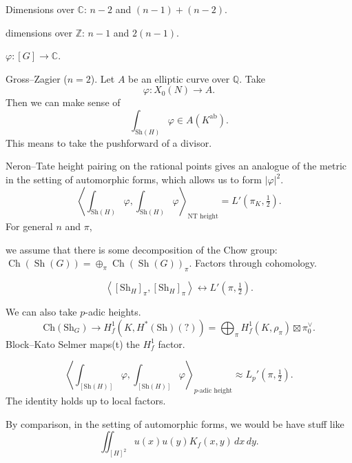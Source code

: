 \documentclass[reqno]{amsart} 
\begin{document}
Dimensions over $\mathbb{C}$: $n - 2$ and $(n - 1) +(n - 2)$.

dimensions over $\mathbb{Z}$: $n - 1$ and $2(n - 1)$.

$\varphi : [G] \rightarrow \mathbb{C}$.

\begin{example}\label{example:cnfg5j3x18}
  Gross--Zagier ($n = 2$).  Let $A$ be an elliptic curve over $\mathbb{Q}$.  Take
  \begin{equation*}
    \varphi : X_0(N) \rightarrow A.
  \end{equation*}
  Then we can make sense of
  \begin{equation*}
    \int_{\mathrm{Sh}(H)} \varphi \in A(K^{\mathrm{ab}}).
  \end{equation*}
  This means to take the pushforward of a divisor.

  Neron--Tate height pairing on the rational points gives an analogue of the metric in the setting of automorphic forms, which allows us to form $\lvert \varphi \rvert^2$.
  \begin{equation*}
    \left\langle
      \int_{\mathrm{Sh}(H)} \varphi,
      \int_{\mathrm{Sh}(H)} \varphi
    \right\rangle_{\mathrm{NT} \text{ height}} = L '(\pi_K, \tfrac{1}{2}).
  \end{equation*}
  For general $n$ and $\pi$,

  we assume that there is some decomposition of the Chow group: $\operatorname{Ch}(\operatorname{Sh}(G)) = \oplus_\pi \operatorname{Ch}(\operatorname{Sh}(G))_\pi$.  Factors through cohomology.
  
  \begin{equation*}
    \left\langle [\mathrm{Sh}_H]_\pi, [\mathrm{Sh}_H]_\pi \right\rangle
    \leftrightarrow
    L '(\pi, \tfrac{1}{2}).
  \end{equation*}

  We can also take $p$-adic heights.
  \begin{equation*}
    \mathrm{Ch}(\mathrm{Sh}_G) \rightarrow  H^1_f(K, H^\ast(\mathrm{Sh})(?))
    = \bigoplus_\pi H_f^1(K, \rho_\pi) \boxtimes \pi_0^\vee.
  \end{equation*}
  Block--Kato Selmer maps(t) the $H^1_f$ factor.

  \begin{theorem}\label{theorem:cnfg5jyfj8}
    \begin{equation*}
      \left\langle \int_{[\mathrm{Sh}(H)]} \varphi, \int_{[\mathrm{Sh}(H)]} \varphi \right\rangle_{\text{$p$-adic height}}
      \approx L_p '(\pi , \tfrac{1}{2}).
    \end{equation*}
    The identity holds up to local factors.
  \end{theorem}

  By comparison, in the setting of automorphic forms, we would be have stuff like
  \begin{equation*}
    \iint_{[H]^2 } u(x) u(y) K_f(x,y) \, d x \, d y.
  \end{equation*}

  
\end{example}
\end{document}
